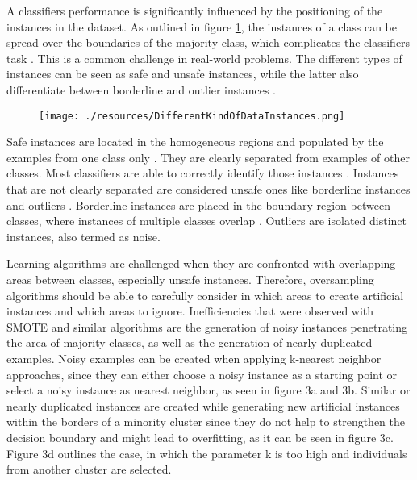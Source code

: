 \documentclass[parskip=full]{scrartcl}
\begin{document}
A classifiers performance is significantly influenced by the positioning of the
instances in the dataset. As outlined in figure \ref{fig:Saez}, the instances of
a class can be spread over the boundaries of the majority class, which
complicates the classifiers task \cite{Tang}. This is a common challenge in
real-world problems. The different types of instances can be seen as safe and
unsafe instances, while the latter also differentiate between borderline and
outlier instances \cite{Saez}.

\begin{figure}[H]
	\centering
	\texttt{[image: ./resources/DifferentKindOfDataInstances.png]}
	\label{fig:Saez}
\end{figure}

Safe instances are located in the homogeneous regions and populated by the
examples from one class only \cite{rodriguez2012hybrid}. They are clearly
separated from examples of other classes. Most classifiers are able to correctly
identify those instances \cite{Prati2004B}. Instances that are not clearly
separated are considered unsafe ones like borderline instances and outliers
\cite{Kubat2000}. Borderline instances are placed in the boundary region between
classes, where instances of multiple classes overlap \cite{Saez}. Outliers are
isolated distinct instances, also termed as noise. 

Learning algorithms are challenged when they are confronted with overlapping
areas between classes, especially unsafe instances. Therefore, oversampling
algorithms should be able to carefully consider in which areas to create
artificial instances and which areas to ignore. Inefficiencies that were
observed with SMOTE and similar algorithms are the generation of noisy instances
penetrating the area of majority classes, as well as the generation of nearly
duplicated examples. Noisy examples can be created when applying k-nearest
neighbor approaches, since they can either choose a noisy instance as a starting
point or select a noisy instance as nearest neighbor, as seen in figure 3a and
3b. Similar or nearly duplicated instances are created while generating new
artificial instances within the borders of a minority cluster since they do not
help to strengthen the decision boundary and might lead to overfitting, as it
can be seen in figure 3c. Figure 3d outlines the case, in which the parameter k
is too high and individuals from another cluster are selected.
\end{document}
